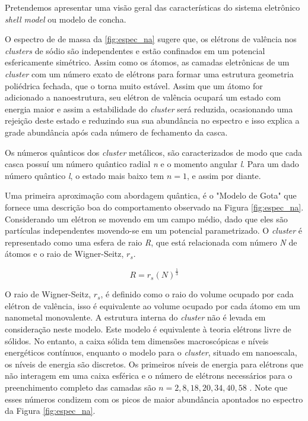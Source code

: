 Pretendemos apresentar uma visão geral das características do sistema eletrônico \textit{shell model} ou modelo de concha.

O espectro de de massa da \ref{fig:espec_na} sugere que, os elétrons de valência nos \textit{clusters} de sódio são independentes e estão confinados em um potencial esfericamente simétrico. Assim como os átomos, as camadas eletrônicas de um \textit{cluster} com um número exato de elétrons para formar uma estrutura geometria poliédrica fechada, que o torna muito estável. Assim que um átomo for adicionado a nanoestrutura, seu elétron de valência ocupará um estado com energia maior e assim a estabilidade do \textit{cluster} será reduzida, ocasionando uma rejeição deste estado e reduzindo sua sua abundância no espectro e isso explica a grade abundância após cada número de fechamento da casca.

Os números quânticos dos \textit{cluster} metálicos, são caracterizados de modo que cada casca possuí um número quântico radial \textit{n} e o momento angular \textit{l}. Para um dado número quântico \textit{l}, o estado mais baixo tem $n = 1$, e assim por diante.


Uma primeira aproximação com abordagem quântica, é o "Modelo de Gota" que fornece uma descrição boa do comportamento observado na Figura \ref{fig:espec_na}. Considerando um elétron se movendo em um campo médio, dado que eles são partículas independentes movendo-se em um potencial parametrizado. O \textit{cluster} é representado como uma esfera de raio \textit{R}, que está relacionada com número \textit{N} de átomos e o raio de Wigner-Seitz, $r_{s}$.


\begin{equation}
    R = r_{s}(N)^{\frac{1}{3}}
\end{equation}

O raio de Wigner-Seitz, $r_{s}$, é definido como o raio do volume ocupado por cada elétron de valência, isso é equivalente ao volume ocupado por cada átomo em um nanometal monovalente.
A estrutura interna do \textit{cluster} não é levada em consideração neste modelo. Este modelo é equivalente à teoria elétrons livre de sólidos. No entanto, a caixa sólida tem dimensões macroscópicas e níveis energéticos contínuos, enquanto o modelo para o \textit{cluster}, situado em nanoescala, os níveis de energia são discretos. Os primeiros níveis de energia para elétrons que não interagem em uma caixa esférica e o número de elétrons necessários para o preenchimento completo das camadas são $n= 2,8,18,20,34,40,58$ \cite{livro_cap16_Misra2012527}. Note que esses números condizem com os picos de maior abundância apontados no espectro da Figura \ref{fig:espec_na}.


